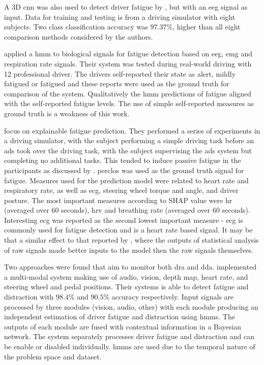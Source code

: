 \documentclass[11pt, parskip=half*,twoside=false]{scrbook}
\begin{document}
A 3D \gls{cnn} was also used to detect driver fatigue by \citet{gaoEEGBasedSpatioTemporal2019}, but with an  \gls{eeg} signal as input. Data for training and testing is from a driving simulator with eight subjects. Two class classification accuracy was $97.37\%$, higher than all eight comparison methods considered by the authors.

\citet{fuDynamicDriverFatigue2016} applied a \gls{hmm} to biological signals for fatigue detection based on \gls{eeg}, \gls{emg} and respiration rate signals. Their system was tested during real-world driving with 12 professional driver. The drivers self-reported their state as alert, mildly fatigued or fatigued and these reports were used as the ground truth for comparison of the system. Qualitatively the \gls{hmm} predictions of fatigue aligned with the self-reported fatigue levels. The use of simple self-reported measures as ground truth is a weakness of this work.

\citet{zhouPredictingDriverFatigue2021} focus on explainable fatigue prediction. They performed a series of experiments in a driving simulator, with the subject performing a simple driving task before an \gls{ads} took over the driving task, with the subject supervising the \gls{ads} system but completing no additional tasks. This tended to induce passive fatigue in the participants as discussed by \citep{goncalvesDrowsinessConditionalAutomation2016}. \Gls{perclos} was used as the ground truth signal for fatigue. Measures used for the prediction model were related to heart rate and respiratory rate, as well as \gls{ecg}, steering wheel torque and angle, and driver posture. The most important measures according to SHAP value were \gls{hr} (averaged over 60 seconds), \gls{hrv} and breathing rate (averaged over 60 seconds). Interesting \gls{ecg} was reported as the second lowest important measure - \gls{ecg} is commonly used for fatigue detection and is a heart rate based signal. It may be that a similar effect to that reported by \citet{wollmerOnlineDriverDistraction2011}, where the outputs of statistical analysis of raw signals made better inputs to the model then the raw signals themselves.
 
Two approaches were found that aim to monitor both \gls{dra} and \gls{dda}. \citet{crayeMultiModalDriverFatigue2016} implemented a multi-modal system making use of audio, vision, depth map, heart rate, and steering wheel and pedal positions. Their systems is able to detect fatigue and distraction with $98.4\%$ and $90.5\%$ accuracy respectively. Input signals are processed by three modules (vision, audio, other) with each module producing an independent estimation of driver fatigue and distraction using \glspl{hmm}. The outputs of each module are fused with contextual information in a Bayesian network. The system separately processes driver fatigue and distraction and can be enable or disabled individually. \Glspl{hmm} are used due to the temporal nature of the problem space and dataset.
\end{document}
